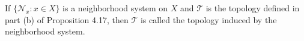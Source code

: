 If $\{\mathcal{N}_x: x \in X\}$ is a neighborhood system on $X$ and $\mathcal{T}$ is the topology defined in part (b) of Proposition 4.17, then $\mathcal{T}$ is called the topology induced by the neighborhood system.